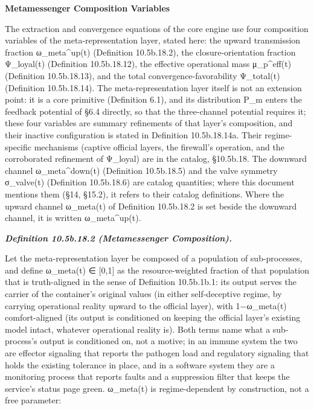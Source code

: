 \documentclass[
]{article}
\begin{document}
\textbf{Metamessenger Composition Variables}

The extraction and convergence equations of the core engine use four
composition variables of the meta-representation layer, stated here: the
upward transmission fraction ω\_meta\^{}up(t) (Definition 10.5b.18.2),
the closure-orientation fraction Ψ\_loyal(t) (Definition 10.5b.18.12),
the effective operational mass μ\_p\^{}eff(t) (Definition 10.5b.18.13),
and the total convergence-favorability Ψ\_total(t) (Definition
10.5b.18.14). The meta-representation layer itself is not an extension
point: it is a core primitive (Definition 6.1), and its distribution
P\_m enters the feedback potential of §6.4 directly, so that the
three-channel potential requires it; these four variables are summary
refinements of that layer's composition, and their inactive
configuration is stated in Definition 10.5b.18.14a. Their
regime-specific mechanisms (captive official layers, the firewall's
operation, and the corroborated refinement of Ψ\_loyal) are in the
catalog, §10.5b.18. The downward channel ω\_meta\^{}down(t) (Definition
10.5b.18.5) and the valve symmetry σ\_valve(t) (Definition 10.5b.18.6)
are catalog quantities; where this document mentions them (§14, §15.2),
it refers to their catalog definitions. Where the upward channel
ω\_meta(t) of Definition 10.5b.18.2 is set beside the downward channel,
it is written ω\_meta\^{}up(t).

\emph{\textbf{Definition 10.5b.18.2 (Metamessenger Composition).}}

Let the meta-representation layer be composed of a population of
sub-processes, and define ω\_meta(t) ∈ {[}0,1{]} as the
resource-weighted fraction of that population that is truth-aligned in
the sense of Definition 10.5b.1b.1: its output serves the carrier of the
container's original values (in either self-deceptive regime, by
carrying operational reality upward to the official layer), with
1−ω\_meta(t) comfort-aligned (its output is conditioned on keeping the
official layer's existing model intact, whatever operational reality
is). Both terms name what a sub-process's output is conditioned on, not
a motive; in an immune system the two are effector signaling that
reports the pathogen load and regulatory signaling that holds the
existing tolerance in place, and in a software system they are a
monitoring process that reports faults and a suppression filter that
keeps the service's status page green. ω\_meta(t) is regime-dependent by
construction, not a free parameter:
\end{document}
